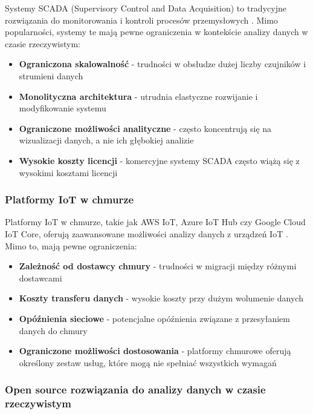 Systemy SCADA (Supervisory Control and Data Acquisition) to tradycyjne rozwiązania do monitorowania i kontroli procesów przemysłowych \citep{scada}.
Mimo popularności, systemy te mają pewne ograniczenia w kontekście analizy danych w czasie rzeczywistym:

\begin{itemize}
    \item \textbf{Ograniczona skalowalność} - trudności w obsłudze dużej liczby czujników i strumieni danych
    \item \textbf{Monolityczna architektura} - utrudnia elastyczne rozwijanie i modyfikowanie systemu
    \item \textbf{Ograniczone możliwości analityczne} - często koncentrują się na wizualizacji danych, a nie ich głębokiej analizie
    \item \textbf{Wysokie koszty licencji} - komercyjne systemy SCADA często wiążą się z wysokimi kosztami licencji
\end{itemize}

\subsubsection{Platformy IoT w chmurze}
\label{subsubsec:cloud_iot}

Platformy IoT w chmurze, takie jak AWS IoT, Azure IoT Hub czy Google Cloud IoT Core, oferują zaawansowane możliwości analizy danych z
urządzeń IoT \citep{cloud_iot}. Mimo to, mają pewne ograniczenia:

\begin{itemize}
    \item \textbf{Zależność od dostawcy chmury} - trudności w migracji między różnymi dostawcami
    \item \textbf{Koszty transferu danych} - wysokie koszty przy dużym wolumenie danych
    \item \textbf{Opóźnienia sieciowe} - potencjalne opóźnienia związane z przesyłaniem danych do chmury
    \item \textbf{Ograniczone możliwości dostosowania} - platformy chmurowe oferują określony zestaw usług, które mogą nie spełniać wszystkich wymagań
\end{itemize}

\subsubsection{Open source rozwiązania do analizy danych w czasie rzeczywistym}
\label{subsubsec:open_source}

